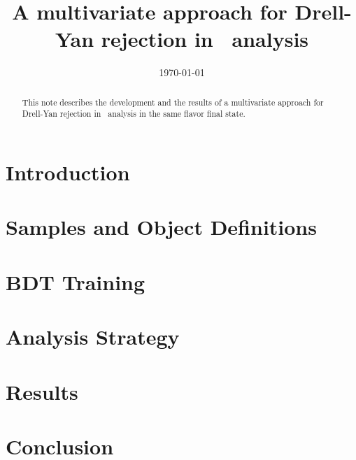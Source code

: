 \documentclass{cmspaper}
\begin{document}
\begin{titlepage}


  \date{\today}

  \title{A multivariate approach for Drell-Yan rejection in \hww\ analysis}
  
  

  \begin{abstract}
    This note describes the development and the results of a  multivariate approach for Drell-Yan rejection in \hww\ analysis in the same flavor final state.
  \end{abstract} 

\end{titlepage}
\tableofcontents
\listoftables
\listoffigures
\newpage 

\section{Introduction}
   \label{sec:introduction}
   

\section{Samples and Object Definitions}
  \label{sec:datasets}
  

\section{BDT Training}
  \label{sec:training}
  

\section{Analysis Strategy}
  \label{sec:strategy}
  

\section{Results}
  \label{sec:results}
  

\section{Conclusion}
   
\clearpage

\end{document}
